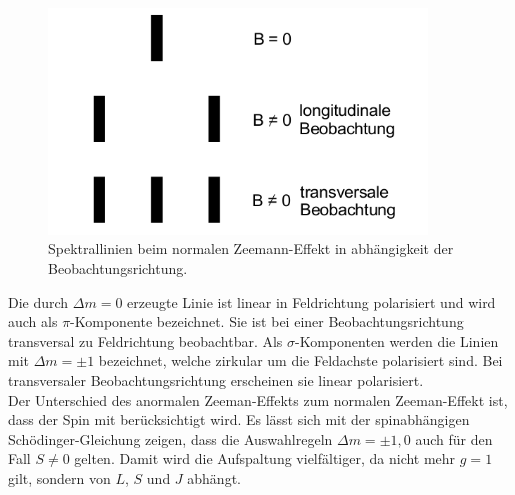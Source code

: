 \begin{figure}
  \centering
  \includegraphics[height=6cm]{Punkt.png}
  \caption{Spektrallinien beim normalen Zeemann-Effekt in abhängigkeit
  der Beobachtungsrichtung.\cite{anleitung}}
  \label{fig:polar}
\end{figure}

Die durch $\Delta m=0$ erzeugte Linie ist linear in Feldrichtung polarisiert und
wird auch als $\pi$-Komponente bezeichnet. Sie ist bei einer Beobachtungsrichtung
transversal zu Feldrichtung beobachtbar. Als $\sigma$-Komponenten
werden die Linien mit $\Delta m=\pm1$ bezeichnet, welche zirkular um die
Feldachste polarisiert sind. Bei transversaler Beobachtungsrichtung erscheinen
sie linear polarisiert.
\\

Der Unterschied des anormalen Zeeman-Effekts zum normalen Zeeman-Effekt ist, dass
der Spin mit berücksichtigt wird. Es lässt sich mit der spinabhängigen
Schödinger-Gleichung zeigen, dass die Auswahlregeln
$\Delta m=\pm1,0$ auch für den Fall $S\neq0$ gelten. Damit wird die Aufspaltung
vielfältiger, da nicht mehr $g=1$ gilt, sondern von $L$, $S$ und $J$ abhängt.
